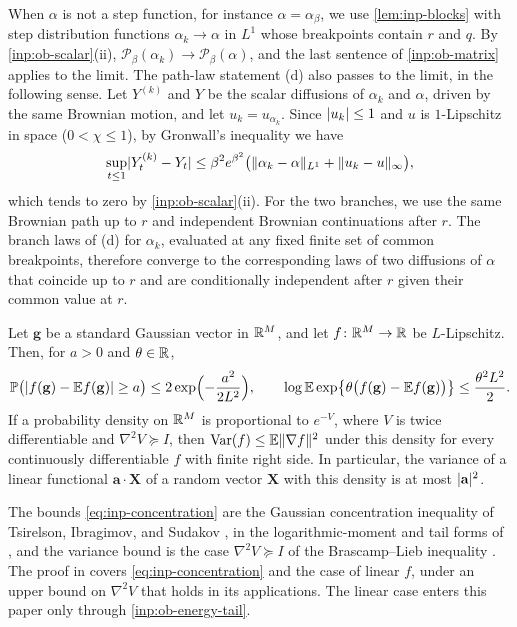 When $\alpha$ is not a step function, for instance $\alpha=\alpha_\beta$, we
use \cref{lem:inp-blocks} with step distribution functions $\alpha_k\to\alpha$
in $L^1$ whose breakpoints contain $r$ and $q$. By \cref{inp:ob-scalar}(ii),
$\mathcal P_\beta(\alpha_k)\to\mathcal P_\beta(\alpha)$, and the last sentence
of \cref{inp:ob-matrix} applies to the limit. The path-law statement (d) also
passes to the limit, in the following sense. Let $Y^{(k)}$ and $Y$ be the scalar
diffusions of $\alpha_k$ and $\alpha$, driven by the same Brownian motion, and
let $u_k=u_{\alpha_k}$. Since $\lvert u_k\rvert\le1$ and $u$ is $1$-Lipschitz in space
($0<\chi\le1$), by Gronwall's inequality we have
\[
 \sup_{t\le1}\lvert Y^{(k)}_t-Y_t\rvert
 \le\beta^2e^{\beta^2}\bigl(\lVert \alpha_k-\alpha\rVert_{L^1}+\lVert u_k-u\rVert_\infty\bigr),
\]
which tends to zero by \cref{inp:ob-scalar}(ii). For the two branches, we use the
same Brownian path up to $r$ and independent Brownian continuations after $r$.
The branch laws of (d) for $\alpha_k$, evaluated at any fixed finite set of
common breakpoints, therefore converge to the corresponding laws of two
diffusions of $\alpha$ that coincide up to $r$ and are conditionally independent
after $r$ given their common value at $r$.

\begin{proposition}\label{inp:ob-concentration}
Let $\mathbf g$ be a standard Gaussian vector in $\mathbb R^M$, and let
$f\colon\mathbb R^M\to\mathbb R$ be $L$-Lipschitz. Then, for $a>0$ and $\theta\in\mathbb R$,
\begin{equation}\label{eq:inp-concentration}
 \mathbb P\bigl(\lvert f(\mathbf g)-\mathbb E f(\mathbf g)\rvert\ge a\bigr)\le2\exp\Bigl(-\frac{a^2}{2L^2}\Bigr),
 \qquad
 \log\mathbb E\exp\bigl\{\theta\bigl(f(\mathbf g)-\mathbb E f(\mathbf g)\bigr)\bigr\}\le\frac{\theta^2L^2}{2}.
\end{equation}
If a probability density on $\mathbb R^M$ is proportional to $e^{-V}$, where $V$ is twice
differentiable and $\nabla^2V\succeq I$, then $\operatorname{Var}(f)\le\mathbb E\lVert \nabla f\rVert^2$
under this density for every continuously differentiable $f$ with finite right
side. In particular, the variance of a linear functional $\mathbf a\cdot\mathbf
X$ of a random vector $\mathbf X$ with this density is at most $\lvert \mathbf a\rvert^2$.
\end{proposition}

The bounds \eqref{eq:inp-concentration} are the Gaussian concentration
inequality of Tsirelson, Ibragimov, and Sudakov \cite{tsirelson-ibragimov-sudakov-1976},
in the logarithmic-moment and tail forms of
\cite[Section~5.4, Theorems~5.5--5.6]{boucheron-lugosi-massart-2013},
and the variance bound is the case $\nabla^2V\succeq I$ of the Brascamp--Lieb
inequality \cite[Theorem~4.1]{brascamp-lieb-1976}. The proof in
\cite{oai-barriers} covers \eqref{eq:inp-concentration} and the case of linear
$f$, under an upper bound on $\nabla^2V$ that holds in its applications. The
linear case enters this paper only through \cref{inp:ob-energy-tail}.

